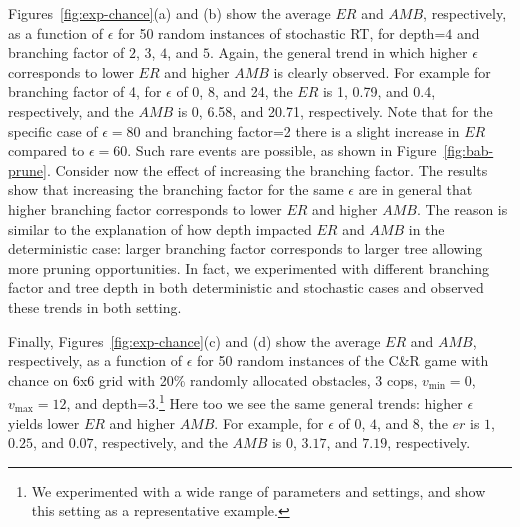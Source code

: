 \documentclass[letterpaper]{article} %
\newcounter{bab}
\newcommand{\vmax}{v_{\text{max}}}
\newcommand{\vmin}{v_{\text{min}}}
\newcommand{\amb}{\textit{AMB}}
\newcommand{\er}{\textit{ER}}
\begin{document}
Figures~\ref{fig:exp-chance}(a) and (b) show the average $\er$ and $\amb$, respectively, as a function of $\epsilon$ for 50 random instances of stochastic RT, for depth=$4$ and branching factor of $2$, $3$, $4$, and $5$. Again, the general trend in which higher $\epsilon$ corresponds to lower $\er$ and higher $\amb$ is clearly observed. For example for branching factor of 4, for $\epsilon$ of 0, 8, and 24, the $\er$ is 1, 0.79, and 0.4, respectively, and the $\amb$ is 0, 6.58, and 20.71, respectively.
Note that for the specific case of $\epsilon=80$ and branching factor=2 there is a slight increase in $\er$ compared to $\epsilon=60$. Such rare events are possible, as shown in Figure~\ref{fig:bab-prune}. 
Consider now the effect of increasing the branching factor. The results show that increasing the branching factor for the same $\epsilon$ are in general that higher branching factor corresponds to lower $\er$ and higher $\amb$. The reason is similar to the explanation of how depth impacted $\er$ and $\amb$ in the deterministic case: larger branching factor corresponds to larger tree allowing more pruning opportunities. 
In fact, we experimented with different branching factor and tree depth in both deterministic and stochastic cases and observed these trends in both setting. 

Finally, Figures~\ref{fig:exp-chance}(c) and (d) show the average $\er$ and $\amb$, respectively, as a function of $\epsilon$ for 50 random instances of the C\&R game with chance on 6x6 grid with 20\% randomly allocated obstacles, 3 cops, $\vmin=0$, $\vmax=12$, and depth=$3$.\footnote{We experimented with a wide range of parameters and settings, and show this setting as a representative example.} Here too we see the same general trends: higher $\epsilon$ yields lower $\er$ and higher $\amb$. For example, for $\epsilon$ of $0$, $4$, and $8$, the $er$ is $1$, $0.25$, and $0.07$, respectively, and the $\amb$ is $0$, $3.17$, and $7.19$, respectively.
\end{document}
